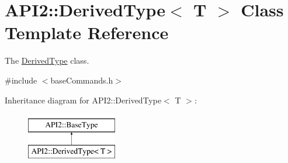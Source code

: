 \hypertarget{class_a_p_i2_1_1_derived_type}{\section{A\-P\-I2\-:\-:Derived\-Type$<$ T $>$ Class Template Reference}
\label{class_a_p_i2_1_1_derived_type}
}


The \hyperlink{class_a_p_i2_1_1_derived_type}{Derived\-Type} class.  




{\ttfamily \#include $<$base\-Commands.\-h$>$}

Inheritance diagram for A\-P\-I2\-:\-:Derived\-Type$<$ T $>$\-:\begin{figure}[H]
\begin{center}
\leavevmode
\includegraphics[height=2.000000cm]{class_a_p_i2_1_1_derived_type}
\end{center}
\end{figure}
